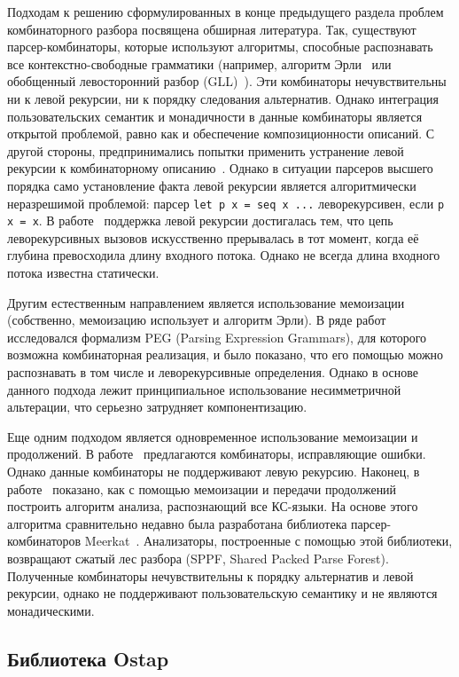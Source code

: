 \documentclass[conference]{IEEEtran}
\begin{document}
Подходам к решению сформулированных в конце предыдущего раздела проблем комбинаторного разбора посвящена обширная литература. Так, существуют парсер-комбинаторы,
которые используют алгоритмы, способные распознавать все контекстно-свободные грамматики (например, алгоритм Эрли~\cite{earleycomb} или обобщенный левосторонний разбор
(GLL)~\cite{GLLcomb}). Эти комбинаторы нечувствительны ни к левой рекурсии, ни к порядку следования альтернатив. Однако интеграция пользовательских семантик и монадичности
в данные комбинаторы является открытой проблемой, равно как и обеспечение композиционности описаний. С другой стороны, предпринимались попытки применить устранение
левой рекурсии к комбинаторному описанию~\cite{leftcorner}. Однако в ситуации парсеров высшего порядка само установление факта левой рекурсии является алгоритмически
неразрешимой проблемой: парсер \lstinline|let p x = seq x ...| леворекурсивен, если \lstinline|p x = x|. В работе~\cite{frost} поддержка левой рекурсии достигалась тем,
что цепь леворекурсивных вызовов искусственно прерывалась в тот момент, когда её глубина превосходила длину входного потока. Однако не всегда длина входного
потока известна статически.

Другим естественным направлением является использование мемоизации (собственно, мемоизацию использует и алгоритм Эрли). В ряде работ~\cite{tratt,warth,ford2002packrat,ford2004parsing}
исследовался формализм PEG (Parsing Expression Grammars), для которого возможна комбинаторная реализация, и было показано, что его помощью можно распознавать
в том числе и леворекурсивные определения. Однако в основе данного подхода лежит принципиальное использование несимметричной альтерации, что серьезно затрудняет
компонентизацию.

Еще одним подходом является одновременное использование мемоизации и продолжений. В работе~\cite{swierstra2001combinator} предлагаются комбинаторы, исправляющие
ошибки. Однако данные комбинаторы не поддерживают левую рекурсию. Наконец, в работе~\cite{memo} показано, как с помощью мемоизации и передачи продолжений построить
алгоритм анализа, распознающий все КС-языки. На основе этого алгоритма сравнительно недавно была разработана библиотека парсер-комбинаторов Meerkat~\cite{meerkat}.
Анализаторы, построенные с помощью этой библиотеки, возвращают сжатый лес разбора (SPPF, Shared Packed Parse Forest). Полученные комбинаторы нечувствительны к порядку
альтернатив и левой рекурсии, однако не поддерживают пользовательскую семантику и не являются монадическими.

\subsection{Библиотека Ostap}
\end{document}

